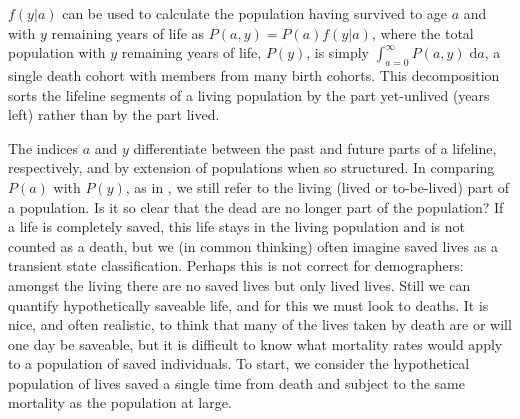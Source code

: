 \documentclass{article}
\newcommand{\dd}{\; \mathrm{d}}
\begin{document}
$f(y|a)$ can be used to calculate the population having survived to age $a$ and
with $y$ remaining years of life as $P(a,y) = P(a)f(y|a)$, where the total
population with $y$ remaining years of life, $P(y)$, is simply $\int
_{a=0}^\infty P(a,y) \dd a$, a single death cohort with members from many birth
cohorts. This decomposition sorts the lifeline segments of a living population
by the part yet-unlived (years left) rather than by the part lived. 

The indices $a$ and $y$ differentiate between the past and future
parts of a lifeline, respectively, and by extension of populations when
so structured.
In comparing $P(a)$ with $P(y)$, as in \citet{brouard1986structure}, we still
refer to the living (lived or to-be-lived) part of a population.
Is it so clear that the dead are no longer part of the population? If a life is
completely saved, this life stays in the living population and is not counted
as a death, but we (in common thinking) often imagine saved lives as a transient
state classification.
Perhaps this is not correct for demographers: amongst the living there
are no saved lives but only lived lives. Still we can quantify
hypothetically saveable life, and for this we must look to deaths.
It is nice, and often realistic, to think that many of the lives taken by death
are or will one day be saveable, but it is difficult to know what mortality
rates would apply to a population of saved individuals. To start, we consider
the hypothetical population of lives saved a single time from death and subject to
the same mortality as the population at large.
\end{document}
